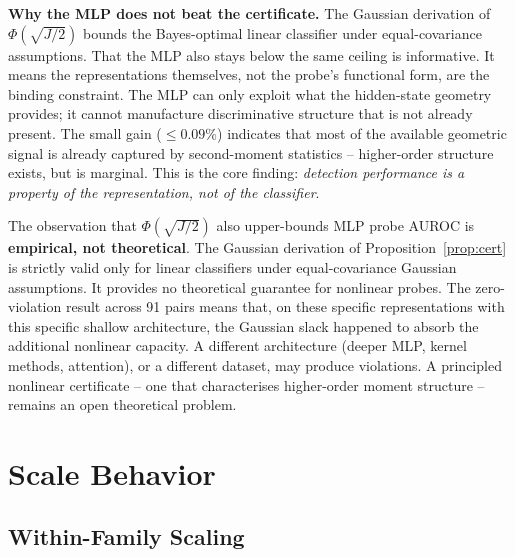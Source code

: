 \documentclass[onecolumn]{jmlr}
\begin{document}
\textbf{Why the MLP does not beat the certificate.}
The Gaussian derivation of $\Phi(\sqrt{J/2})$ bounds the Bayes-optimal
linear classifier under equal-covariance assumptions. That the MLP also
stays below the same ceiling is informative. It means the
representations themselves, not the probe's functional form, are the
binding constraint. The MLP can only exploit what the hidden-state
geometry provides; it cannot manufacture discriminative structure that
is not already present. The small gain ($\leq 0.09\%$) indicates that
most of the available geometric signal is already captured by
second-moment statistics -- higher-order structure exists, but is
marginal. This is the core finding: \emph{detection performance is a
property of the representation, not of the classifier}.

\begin{remark}
The observation that $\Phi(\sqrt{J/2})$ also upper-bounds MLP probe
AUROC is \textbf{empirical, not theoretical}. The Gaussian derivation of
Proposition~\ref{prop:cert} is strictly valid only for linear
classifiers under equal-covariance Gaussian assumptions. It provides no
theoretical guarantee for nonlinear probes. The zero-violation result
across 91 pairs means that, on these specific representations with this
specific shallow architecture, the Gaussian slack happened to absorb
the additional nonlinear capacity. A different architecture (deeper
MLP, kernel methods, attention), or a different dataset, may produce
violations. A principled nonlinear certificate -- one that
characterises higher-order moment structure -- remains an open
theoretical problem.
\end{remark}

\FloatBarrier
\section{Scale Behavior}
\label{sec:scale}

\subsection{Within-Family Scaling}
\label{sec:scale-curve}
\end{document}
